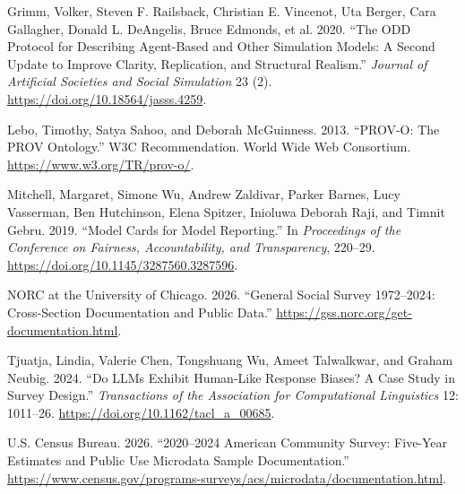 \documentclass[
  11pt,
]{article}
\newlength{\cslhangindent}
\newenvironment{CSLReferences}[2] %
 {\begin{list}{}{%
  \setlength{\itemindent}{0pt}
  \setlength{\leftmargin}{0pt}
  \setlength{\parsep}{0pt}
  \ifodd #1
   \setlength{\leftmargin}{\cslhangindent}
   \setlength{\itemindent}{-1\cslhangindent}
  \fi
  \setlength{\itemsep}{#2\baselineskip}}}
 {\end{list}}
\begin{document}
\begin{CSLReferences}{1}{0}
Grimm, Volker, Steven F. Railsback, Christian E. Vincenot, Uta Berger,
Cara Gallagher, Donald L. DeAngelis, Bruce Edmonds, et al. 2020. {``The
ODD Protocol for Describing Agent-Based and Other Simulation Models: A
Second Update to Improve Clarity, Replication, and Structural
Realism.''} \emph{Journal of Artificial Societies and Social Simulation}
23 (2). \url{https://doi.org/10.18564/jasss.4259}.

Lebo, Timothy, Satya Sahoo, and Deborah McGuinness. 2013. {``PROV-O: The
PROV Ontology.''} W3C Recommendation. World Wide Web Consortium.
\url{https://www.w3.org/TR/prov-o/}.

Mitchell, Margaret, Simone Wu, Andrew Zaldivar, Parker Barnes, Lucy
Vasserman, Ben Hutchinson, Elena Spitzer, Inioluwa Deborah Raji, and
Timnit Gebru. 2019. {``Model Cards for Model Reporting.''} In
\emph{Proceedings of the Conference on Fairness, Accountability, and
Transparency}, 220--29. \url{https://doi.org/10.1145/3287560.3287596}.

NORC at the University of Chicago. 2026. {``General Social Survey
1972--2024: Cross-Section Documentation and Public Data.''}
\url{https://gss.norc.org/get-documentation.html}.

Tjuatja, Lindia, Valerie Chen, Tongshuang Wu, Ameet Talwalkwar, and
Graham Neubig. 2024. {``Do LLMs Exhibit Human-Like Response Biases? A
Case Study in Survey Design.''} \emph{Transactions of the Association
for Computational Linguistics} 12: 1011--26.
\url{https://doi.org/10.1162/tacl_a_00685}.

U.S. Census Bureau. 2026. {``2020--2024 American Community Survey:
Five-Year Estimates and Public Use Microdata Sample Documentation.''}
\url{https://www.census.gov/programs-surveys/acs/microdata/documentation.html}.

\end{CSLReferences}
\end{document}
